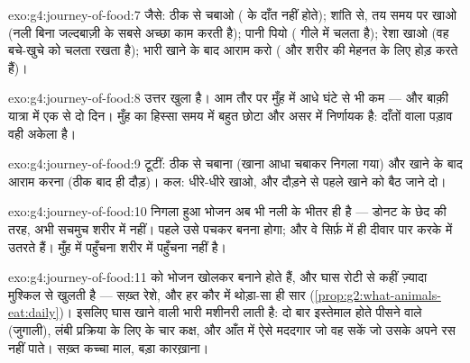 \begin{solution}{exo:g4:journey-of-food:7}
जैसे: ठीक से चबाओ ( के दाँत नहीं होते); शांति से, तय समय पर खाओ
(नली बिना जल्दबाज़ी के सबसे अच्छा काम करती है); पानी पियो ( गीले
में चलता है); रेशा खाओ (वह बचे-खुचे को चलता रखता है); भारी खाने के बाद
आराम करो ( और  शरीर की मेहनत के लिए होड़ करते हैं)।
\end{solution}

\begin{solution}{exo:g4:journey-of-food:8}
उत्तर खुला है। आम तौर पर मुँह में आधे घंटे से भी कम --- और बाक़ी यात्रा
में एक से दो दिन। मुँह का हिस्सा समय में बहुत छोटा और असर में निर्णायक
है: दाँतों वाला पड़ाव वही अकेला है।
\end{solution}

\begin{solution}{exo:g4:journey-of-food:9}
टूटीं: ठीक से चबाना (खाना आधा चबाकर निगला गया) और खाने के बाद आराम
करना (ठीक बाद ही दौड़)। कल: धीरे-धीरे खाओ, और दौड़ने से पहले खाने को
बैठ जाने दो।
\end{solution}

\begin{solution}{exo:g4:journey-of-food:10}
निगला हुआ भोजन अब भी नली के भीतर ही है --- डोनट के छेद की तरह, अभी
सचमुच शरीर में नहीं। पहले उसे पचकर  बनना होगा; और वे  सिर्फ़  में ही दीवार पार करके  में उतरते हैं। मुँह में
पहुँचना शरीर में पहुँचना नहीं है।
\end{solution}

\begin{solution}{exo:g4:journey-of-food:11}
 को भोजन खोलकर  बनाने होते हैं, और घास रोटी से कहीं ज़्यादा
मुश्किल से खुलती है --- सख़्त रेशे, और हर कौर में थोड़ा-सा ही सार
(\cref{prop:g2:what-animals-eat:daily})। इसलिए घास खाने वाली भारी
मशीनरी लाती है: दो बार इस्तेमाल होते पीसने वाले  (जुगाली), लंबी
प्रक्रिया के लिए  के चार कक्ष, और आँत में ऐसे मददगार जो वह 
सकें जो उसके अपने रस नहीं  पाते। सख़्त कच्चा माल, बड़ा कारख़ाना।
\end{solution}
